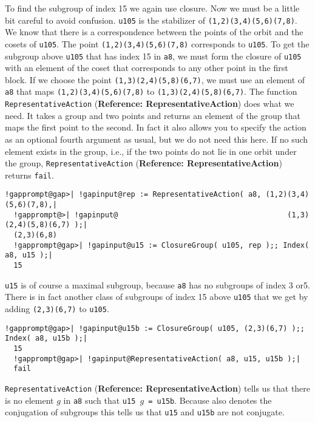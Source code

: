\documentclass[a4paper,11pt]{report}
\begin{document}
{{ To find the subgroup of index 15 we again use closure. Now we must be a little
bit careful to avoid confusion. \texttt{u105} is the stabilizer of \texttt{(1,2)(3,4)(5,6)(7,8)}. We know that there is a correspondence between the points of the orbit and
the cosets of \texttt{u105}. The point \texttt{(1,2)(3,4)(5,6)(7,8)} corresponds to \texttt{u105}. To get the subgroup above \texttt{u105} that has index 15 in \texttt{a8}, we must form the closure of \texttt{u105} with an element of the coset that corresponds to any other point in the first
block. If we choose the point \texttt{(1,3)(2,4)(5,8)(6,7)}, we must use an element of \texttt{a8} that maps \texttt{(1,2)(3,4)(5,6)(7,8)} to \texttt{(1,3)(2,4)(5,8)(6,7)}. The function \texttt{RepresentativeAction} (\textbf{Reference: RepresentativeAction}) does what we need. It takes a group and two points and returns an element of
the group that maps the first point to the second. In fact it also allows you
to specify the action as an optional fourth argument as usual, but we do not
need this here. If no such element exists in the group, i.e., if the two
points do not lie in one orbit under the group, \texttt{RepresentativeAction} (\textbf{Reference: RepresentativeAction}) returns \texttt{fail}. 

 
\begin{Verbatim}[commandchars=!@|,fontsize=\small,frame=single,label=Example]
  !gapprompt@gap>| !gapinput@rep := RepresentativeAction( a8, (1,2)(3,4)(5,6)(7,8),|
  !gapprompt@>| !gapinput@                                       (1,3)(2,4)(5,8)(6,7) );|
  (2,3)(6,8)
  !gapprompt@gap>| !gapinput@u15 := ClosureGroup( u105, rep );; Index( a8, u15 );|
  15
\end{Verbatim}
 

 \texttt{u15} is of course a maximal subgroup, because \texttt{a8} has no subgroups of index 3 or{\nobreakspace}5. There is in fact another class
of subgroups of index 15 above \texttt{u105} that we get by adding \texttt{(2,3)(6,7)} to \texttt{u105}. 

 
\begin{Verbatim}[commandchars=!@|,fontsize=\small,frame=single,label=Example]
  !gapprompt@gap>| !gapinput@u15b := ClosureGroup( u105, (2,3)(6,7) );; Index( a8, u15b );|
  15
  !gapprompt@gap>| !gapinput@RepresentativeAction( a8, u15, u15b );|
  fail
\end{Verbatim}
 

 \texttt{RepresentativeAction} (\textbf{Reference: RepresentativeAction}) tells us that there is no element $g$ in \texttt{a8} such that \texttt{u15 \texttt{} }$g$\texttt{ = u15b}. Because \texttt{\texttt{}} also denotes the conjugation of subgroups this tells us that \texttt{u15} and \texttt{u15b} are not conjugate. 

}}
\end{document}
